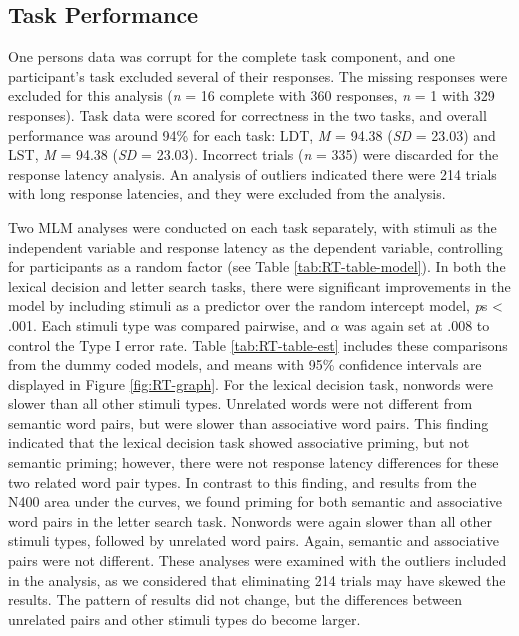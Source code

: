 \documentclass[english,man]{apa6}
\theoremstyle{definition}
\theoremstyle{definition}
\theoremstyle{definition}
\theoremstyle{remark}
\begin{document}
\subsection{Task Performance}\label{task-performance}

One persons data was corrupt for the complete task component, and one
participant's task excluded several of their responses. The missing
responses were excluded for this analysis (\emph{n} = 16 complete with
360 responses, \emph{n} = 1 with 329 responses). Task data were scored
for correctness in the two tasks, and overall performance was around
94\% for each task: LDT, \emph{M} = 94.38 (\emph{SD} = 23.03) and LST,
\emph{M} = 94.38 (\emph{SD} = 23.03). Incorrect trials (\emph{n} = 335)
were discarded for the response latency analysis. An analysis of
outliers indicated there were 214 trials with long response latencies,
and they were excluded from the analysis.

Two MLM analyses were conducted on each task separately, with stimuli as
the independent variable and response latency as the dependent variable,
controlling for participants as a random factor (see Table
\ref{tab:RT-table-model}). In both the lexical decision and letter
search tasks, there were significant improvements in the model by
including stimuli as a predictor over the random intercept model,
\emph{p}s \textless{} .001. Each stimuli type was compared pairwise, and
\(\alpha\) was again set at .008 to control the Type I error rate. Table
\ref{tab:RT-table-est} includes these comparisons from the dummy coded
models, and means with 95\% confidence intervals are displayed in Figure
\ref{fig:RT-graph}. For the lexical decision task, nonwords were slower
than all other stimuli types. Unrelated words were not different from
semantic word pairs, but were slower than associative word pairs. This
finding indicated that the lexical decision task showed associative
priming, but not semantic priming; however, there were not response
latency differences for these two related word pair types. In contrast
to this finding, and results from the N400 area under the curves, we
found priming for both semantic and associative word pairs in the letter
search task. Nonwords were again slower than all other stimuli types,
followed by unrelated word pairs. Again, semantic and associative pairs
were not different. These analyses were examined with the outliers
included in the analysis, as we considered that eliminating 214 trials
may have skewed the results. The pattern of results did not change, but
the differences between unrelated pairs and other stimuli types do
become larger.
\end{document}
